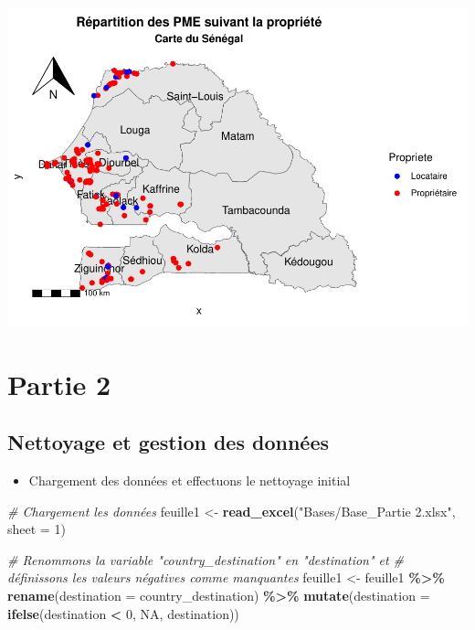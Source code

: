 \documentclass[
]{article}
\newenvironment{Shaded}{\begin{snugshade}}{\end{snugshade}}
\newcommand{\AttributeTok}[1]{\textcolor[rgb]{0.13,0.29,0.53}{#1}}
\newcommand{\CommentTok}[1]{\textcolor[rgb]{0.56,0.35,0.01}{\textit{#1}}}
\newcommand{\ConstantTok}[1]{\textcolor[rgb]{0.56,0.35,0.01}{#1}}
\newcommand{\DecValTok}[1]{\textcolor[rgb]{0.00,0.00,0.81}{#1}}
\newcommand{\FunctionTok}[1]{\textcolor[rgb]{0.13,0.29,0.53}{\textbf{#1}}}
\newcommand{\NormalTok}[1]{#1}
\newcommand{\OtherTok}[1]{\textcolor[rgb]{0.56,0.35,0.01}{#1}}
\newcommand{\SpecialCharTok}[1]{\textcolor[rgb]{0.81,0.36,0.00}{\textbf{#1}}}
\newcommand{\StringTok}[1]{\textcolor[rgb]{0.31,0.60,0.02}{#1}}
\providecommand{\tightlist}{%
  \setlength{\itemsep}{0pt}\setlength{\parskip}{0pt}}
\begin{document}
\includegraphics{RMarkdown_files/figure-latex/unnamed-chunk-20-1.pdf}

\hypertarget{partie-2}{%
\section{Partie 2}\label{partie-2}}

\hypertarget{nettoyage-et-gestion-des-donnuxe9es}{%
\subsection{Nettoyage et gestion des
données}\label{nettoyage-et-gestion-des-donnuxe9es}}

\begin{itemize}
\tightlist
\item
  Chargement des données et effectuons le nettoyage initial
\end{itemize}

\begin{Shaded}
\begin{Highlighting}[]
\CommentTok{\# Chargement les données}
\NormalTok{feuille1 }\OtherTok{\textless{}{-}} \FunctionTok{read\_excel}\NormalTok{(}\StringTok{"Bases/Base\_Partie 2.xlsx"}\NormalTok{, }\AttributeTok{sheet =} \DecValTok{1}\NormalTok{)}

\CommentTok{\# Renommons la variable "country\_destination" en "destination" et }
\CommentTok{\# définissons les valeurs négatives comme manquantes}
\NormalTok{feuille1 }\OtherTok{\textless{}{-}}\NormalTok{ feuille1 }\SpecialCharTok{\%\textgreater{}\%}
  \FunctionTok{rename}\NormalTok{(}\AttributeTok{destination =}\NormalTok{ country\_destination) }\SpecialCharTok{\%\textgreater{}\%}
  \FunctionTok{mutate}\NormalTok{(}\AttributeTok{destination =} \FunctionTok{ifelse}\NormalTok{(destination }\SpecialCharTok{\textless{}} \DecValTok{0}\NormalTok{, }\ConstantTok{NA}\NormalTok{, destination))}
\end{Highlighting}
\end{Shaded}
\end{document}
